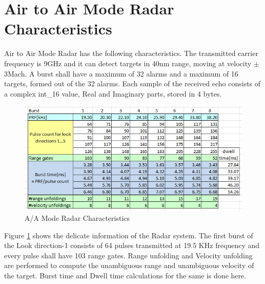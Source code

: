 \section{Air to Air Mode Radar Characteristics}
\label{ss:aa_mode:radar_char}
Air to Air Mode Radar has the following characteristics. The transmitted carrier frequency is 9GHz and it can detect targets in 40nm range, moving at velocity $\pm$3Mach. A burst shall have a maximum of 32 alarms and a maximum of 16 targets, formed out of the 32 alarms. Each sample of the received echo consists of a complex int\_16 value, Real and Imaginary parts, stored in 4 bytes.

\begin{figure}[h!]
	\centering
	\includegraphics[width=140mm]{figures/aa_char}
	\caption{A/A Mode Radar Characteristics}
	\label{fig:bg_related_work:aa_char}
\end{figure}

Figure \ref{fig:bg_related_work:aa_char} shows the delicate information of the Radar system. The first burst of the Look direction-1 consists of 64 pulses transmitted at 19.5 KHz frequency and every pulse shall have 103 range gates. Range unfolding and Velocity unfolding are performed to compute the unambiguous range and unambiguous velocity of the target. Burst time and Dwell time calculations for the same is done here.


